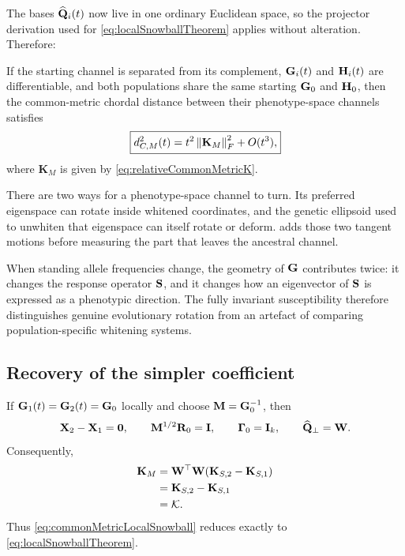 The bases \(\widehat{\mathbf{Q}}_i(t)\) now live in one ordinary Euclidean space, so the projector derivation used for \cref{eq:localSnowballTheorem} applies without alteration. Therefore:

\begin{theorem}
If the starting channel is separated from its complement, \(\mathbf{G}_i(t)\) and \(\mathbf{H}_i(t)\) are differentiable, and both populations share the same starting \(\mathbf{G}_0\) and \(\mathbf{H}_0\), then the common-metric chordal distance between their phenotype-space channels satisfies
\begin{equation}
\boxed{
 d_{C,M}^2(t)
=t^2\left\lVert \mathbf K_M\right\rVert_F^2+O(t^3),}
\label{eq:commonMetricLocalSnowball}
\end{equation}
where \(\mathbf K_M\) is given by \cref{eq:relativeCommonMetricK}.
\end{theorem}

\begin{geombox}
There are two ways for a phenotype-space channel to turn. Its preferred eigenspace can rotate inside whitened coordinates, and the genetic ellipsoid used to unwhiten that eigenspace can itself rotate or deform.  adds those two tangent motions before measuring the part that leaves the ancestral channel.
\end{geombox}

\begin{biobox}
When standing allele frequencies change, the geometry of \(\mathbf{G}\) contributes twice: it changes the response operator \(\mathbf{S}\), and it changes how an eigenvector of \(\mathbf{S}\) is expressed as a phenotypic direction. The fully invariant susceptibility therefore distinguishes genuine evolutionary rotation from an artefact of comparing population-specific whitening systems.
\end{biobox}

\subsection{Recovery of the simpler coefficient}

If \(\mathbf{G}_1(t)=\mathbf{G}_2(t)=\mathbf{G}_0\) locally and choose \(\mathbf{M}=\mathbf{G}_0^{-1}\), then
\begin{equation}
\mathbf X_2-\mathbf X_1=\mathbf{0},
\qquad
\mathbf{M}^{1/2}\mathbf R_0=\mathbf{I},
\qquad
\boldsymbol\Gamma_0=\mathbf{I}_k,
\qquad
\widehat{\mathbf{Q}}_{\perp}=\mathbf{W}.
\end{equation}
Consequently,
\begin{align}
\mathbf K_M
&=\mathbf{W}^\top\mathbf{W}(\mathbf K_{S,2}-\mathbf K_{S,1})\\
&=\mathbf K_{S,2}-\mathbf K_{S,1}\\
&=\mathcal K.
\end{align}
Thus \cref{eq:commonMetricLocalSnowball} reduces exactly to \cref{eq:localSnowballTheorem}.

